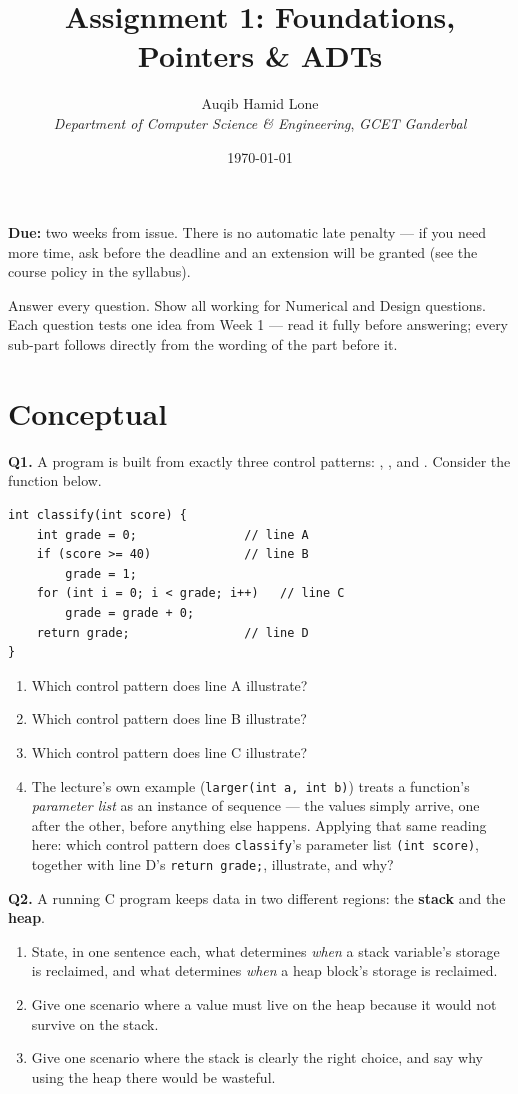 \documentclass[11pt]{article}
\title{Assignment 1: Foundations, Pointers \& ADTs}
\author{Auqib Hamid Lone\\[0.3em]
  \emph{Department of Computer Science \& Engineering}, \emph{GCET Ganderbal}}
\date{\today}
\begin{document}
\maketitle

\noindent\textbf{Due:} two weeks from issue. There is no automatic late penalty --- if you need more time, ask before the deadline and an extension will be granted (see the course policy in the syllabus).

\noindent Answer every question. Show all working for Numerical and Design questions. Each question tests one idea from Week 1 --- read it fully before answering; every sub-part follows directly from the wording of the part before it.

\section{Conceptual}

\textbf{Q1.} A program is built from exactly three control patterns: , , and . Consider the function below.
\begin{verbatim}
int classify(int score) {
    int grade = 0;               // line A
    if (score >= 40)             // line B
        grade = 1;
    for (int i = 0; i < grade; i++)   // line C
        grade = grade + 0;
    return grade;                // line D
}
\end{verbatim}
\begin{enumerate}
  \item[(a)] Which control pattern does line A illustrate?
  \item[(b)] Which control pattern does line B illustrate?
  \item[(c)] Which control pattern does line C illustrate?
  \item[(d)] The lecture's own example (\texttt{larger(int a, int b)}) treats a function's \emph{parameter list} as an instance of sequence --- the values simply arrive, one after the other, before anything else happens. Applying that same reading here: which control pattern does \texttt{classify}'s parameter list \texttt{(int score)}, together with line D's \texttt{return grade;}, illustrate, and why?
\end{enumerate}

\textbf{Q2.} A running C program keeps data in two different regions: the \textbf{stack} and the \textbf{heap}.
\begin{enumerate}
  \item[(a)] State, in one sentence each, what determines \emph{when} a stack variable's storage is reclaimed, and what determines \emph{when} a heap block's storage is reclaimed.
  \item[(b)] Give one scenario where a value must live on the heap because it would not survive on the stack.
  \item[(c)] Give one scenario where the stack is clearly the right choice, and say why using the heap there would be wasteful.
\end{enumerate}
\end{document}
